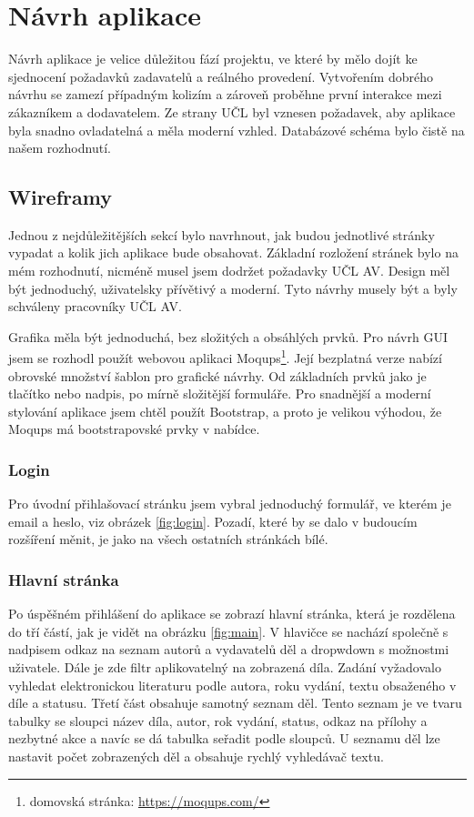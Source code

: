 \chapter{Návrh aplikace}
    Návrh aplikace je velice důležitou fází projektu, ve které by mělo dojít ke sjednocení požadavků zadavatelů a reálného provedení. Vytvořením dobrého návrhu se zamezí případným kolizím a zároveň proběhne první interakce mezi zákazníkem a dodavatelem. Ze strany UČL byl vznesen požadavek, aby aplikace byla snadno ovladatelná a měla moderní vzhled. Databázové schéma bylo čistě na našem rozhodnutí.
    
    \section{Wireframy}
        Jednou z nejdůležitějších sekcí bylo navrhnout, jak budou jednotlivé stránky vypadat a kolik jich aplikace bude obsahovat. Základní rozložení stránek bylo na mém rozhodnutí, nicméně musel jsem dodržet požadavky UČL AV. Design měl být jednoduchý, uživatelsky přívětivý a moderní. Tyto návrhy musely být a byly schváleny pracovníky UČL AV.
        
        Grafika měla být jednoduchá, bez složitých a obsáhlých prvků. Pro návrh GUI jsem se rozhodl použít webovou aplikaci Moqups\footnote{domovská stránka: \url{https://moqups.com/}}. Její bezplatná verze nabízí obrovské množství šablon pro grafické návrhy. Od základních prvků jako je tlačítko nebo nadpis, po mírně složitější formuláře. Pro snadnější a moderní stylování aplikace jsem chtěl použít Bootstrap, a proto je velikou výhodou, že Moqups má bootstrapovské prvky v nabídce. 
        
        \subsection{Login}
            Pro úvodní přihlašovací stránku jsem vybral jednoduchý formulář, ve kterém je email a heslo, viz obrázek \ref{fig:login}. Pozadí, které by se dalo v budoucím rozšíření měnit, je jako na všech ostatních stránkách bílé.
            
        \subsection{Hlavní stránka}
            Po úspěšném přihlášení do aplikace se zobrazí hlavní stránka, která je rozdělena do tří částí, jak je vidět na obrázku \ref{fig:main}. V hlavičce se nachází společně s nadpisem odkaz na seznam autorů a vydavatelů děl a dropwdown s možnostmi uživatele. Dále je zde filtr aplikovatelný na zobrazená díla. Zadání vyžadovalo vyhledat elektronickou literaturu podle autora, roku vydání, textu obsaženého v díle a statusu. Třetí část obsahuje samotný seznam děl. Tento seznam je ve tvaru tabulky se sloupci název díla, autor, rok vydání, status, odkaz na přílohy a nezbytné akce a navíc se dá tabulka seřadit podle sloupců. U seznamu děl lze nastavit počet zobrazených děl a obsahuje rychlý vyhledávač textu.

